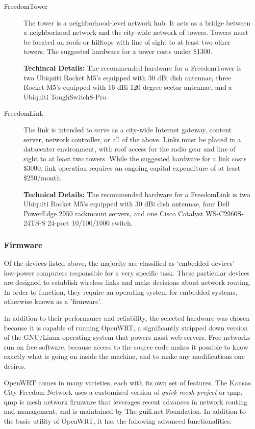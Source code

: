 \begin{description}
\item[FreedomTower] The tower is a neighborhood-level network hub. It
acts as a bridge between a neighborhood network and the city-wide network of
towers. Towers must be located on roofs or hilltops with line of sight to
at least two other towers.
 The suggested hardware for a tower costs under \$1300. \par
{\bf Techincal Details:} The recommended hardware for a FreedomTower is two Ubiquiti Rocket M5's equipped
with 30 dBi dish antennae, three Rocket M5's equipped with 16 dBi 120-degree
sector antennae, and a Ubiquiti ToughSwitch8-Pro. 

\item[FreedomLink] The link is intended to serve as a city-wide 
Internet gateway, content server, network controller, or all of the above. Links must be placed in a
datacenter environment, with roof access for the radio gear and line of sight to
at least two towers. While the suggested hardware for a link costs \$3000, link
operation requires an ongoing capital expenditure of at least \$250/month. \par
{\bf Technical Details:} The 
recommended hardware for a FreedomLink is two Ubiquiti Rocket M5's equipped with 30 dBi dish
antennae, four Dell PowerEdge 2950 rackmount servers, and one Cisco Catalyst
WS-C2960S-24TS-S 24-port 10/100/1000 switch. 
\end{description}

\subsubsection{Firmware}
Of the devices listed above, the majority are classified as `embedded
devices' --- low-power computers responsible for a very specific task. These
particular devices are designed to establish wireless links and make decisions
about network routing. In order to function, they require an operating system
for embedded systems, otherwise known as a 'firmware'. \par
In addition to their performance and reliability, the selected hardware was
chosen because it is capable of running OpenWRT, a significantly stripped down
version of the GNU/Linux operating system that powers most web servers. Free
networks run on free software, because access to the source code makes it
possible to know exactly what is going on inside the machine, and to
make any modifications one desires. \par 
OpenWRT comes in many varieties, each with its own set of features. The Kansas
City Freedom Network uses a customized version of \emph{quick mesh project} or
qmp. qmp is mesh network firmware that leverages recent advances in network
routing and management, and is maintained by The guifi.net Foundation. In
addition to the basic utility of OpenWRT, it has the following advanced
functionalities:

